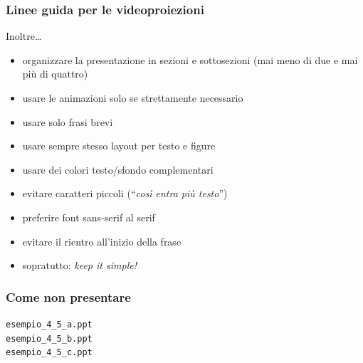 \documentclass[svgnames,%
	ucs,%
	pdftex]{guitbeamer}
\begin{document}
\begin{frame}
  \frametitle{Linee guida per le videoproiezioni}
	Inoltre\dots
	\begin{itemize}
		\item organizzare la presentazione in sezioni e sottosezioni (mai meno di due e mai pi\`u di quattro) 
		\item usare le animazioni solo se strettamente necessario
		\item usare solo frasi brevi
		\item usare sempre stesso layout per testo e figure
		\item usare dei colori testo/sfondo complementari
		\item evitare caratteri piccoli (``\textit{cos\`i entra pi\`u testo}'')
		\item preferire font sans-serif al \textrm{serif}
		\item evitare il rientro all'inizio della frase
		\item sopratutto: \textit{keep it simple!}
	\end{itemize}
\end{frame}
\begin{frame}
  \frametitle{Come \textbf{non} presentare}
	\begin{center}
		\alert{\texttt{esempio\_4\_5\_a.ppt}}\\
		\alert{\texttt{esempio\_4\_5\_b.ppt}}\\
		\alert{\texttt{esempio\_4\_5\_c.ppt}}
	\end{center}
\end{frame}
\end{document}
